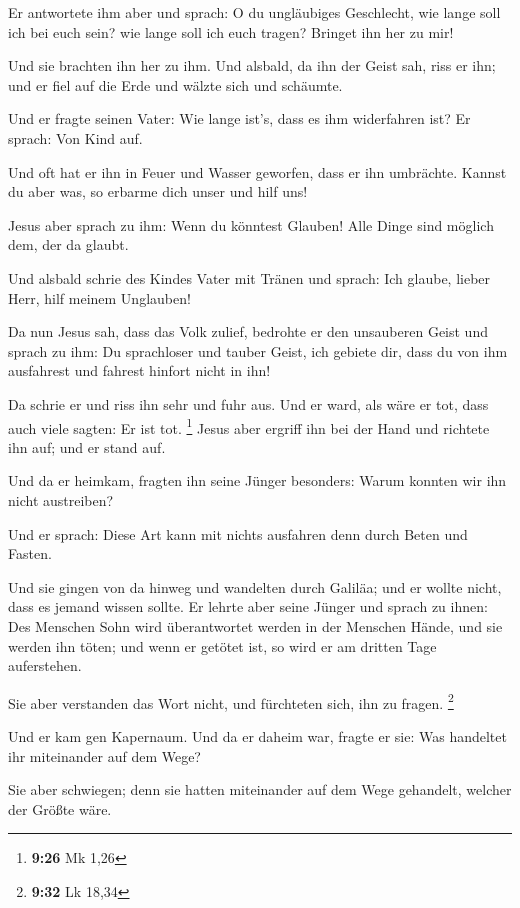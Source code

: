  Er antwortete ihm aber und sprach: O du ungläubiges
Geschlecht, wie lange soll ich bei euch sein? wie lange soll ich euch
tragen? Bringet ihn her zu mir!

 Und sie brachten ihn her zu ihm. Und alsbald, da ihn der
Geist sah, riss er ihn; und er fiel auf die Erde und wälzte sich und
schäumte.

 Und er fragte seinen Vater: Wie lange ist's, dass es ihm
widerfahren ist? Er sprach: Von Kind auf.

 Und oft hat er ihn in Feuer und Wasser geworfen, dass er
ihn umbrächte. Kannst du aber was, so erbarme dich unser und hilf uns!

 Jesus aber sprach zu ihm: Wenn du könntest Glauben! Alle
Dinge sind möglich dem, der da glaubt.

 Und alsbald schrie des Kindes Vater mit Tränen und sprach:
Ich glaube, lieber Herr, hilf meinem Unglauben!

 Da nun Jesus sah, dass das Volk zulief, bedrohte er den
unsauberen Geist und sprach zu ihm: Du sprachloser und tauber Geist, ich
gebiete dir, dass du von ihm ausfahrest und fahrest hinfort nicht in
ihn!

 Da schrie er und riss ihn sehr und fuhr aus. Und er ward,
als wäre er tot, dass auch viele sagten: Er ist tot. \footnote{\textbf{9:26}
  Mk 1,26}  Jesus aber ergriff ihn bei der Hand und
richtete ihn auf; und er stand auf.

 Und da er heimkam, fragten ihn seine Jünger besonders:
Warum konnten wir ihn nicht austreiben?

 Und er sprach: Diese Art kann mit nichts ausfahren denn
durch Beten und Fasten.

 Und sie gingen von da hinweg und wandelten durch Galiläa;
und er wollte nicht, dass es jemand wissen sollte.  Er
lehrte aber seine Jünger und sprach zu ihnen: Des Menschen Sohn wird
überantwortet werden in der Menschen Hände, und sie werden ihn töten;
und wenn er getötet ist, so wird er am dritten Tage auferstehen.

 Sie aber verstanden das Wort nicht, und fürchteten sich,
ihn zu fragen. \footnote{\textbf{9:32} Lk 18,34}

 Und er kam gen Kapernaum. Und da er daheim war, fragte er
sie: Was handeltet ihr miteinander auf dem Wege?

 Sie aber schwiegen; denn sie hatten miteinander auf dem
Wege gehandelt, welcher der Größte wäre.

